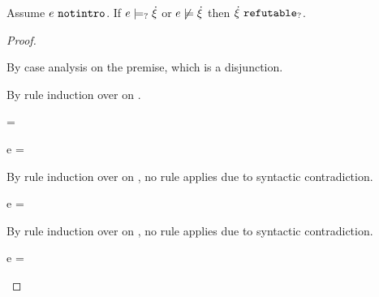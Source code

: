 \begin{lemma}
  \label{lem:notintro-maysat-or-notsat-refutable}
  Assume $e ~\mathtt{notintro}$. If $e \models_{?} \dot{\xi}$ or $e \not\models \dot{\xi}$ then $\dot{\xi} ~\mathtt{refutable}_?$.
\end{lemma}
\begin{proof}
\begin{pfsteps}
  \item {}  
\end{pfsteps}
By case analysis on the premise, which is a disjunction.
\begin{byCases}
  \item[\cmaysatisfy{e}{\hxi}] 
  \begin{pfsteps}
  \item {}  
  \end{pfsteps} 
  By rule induction over  on .
  \begin{byCases}
    \item[\text{(\ref{rule:CMSUnknown})}]
    \begin{pfsteps}
    \item \hxi = \cunknown {}
    \item {} 
    \end{pfsteps} 
    \item[\text{(\ref{rule:CMSInl})}]
    \begin{pfsteps}
    \item e =  
    \end{pfsteps} 
    By rule induction over  on , no rule applies due to syntactic contradiction.
    \item[\text{(\ref{rule:CMSInr})}]
    \begin{pfsteps}
    \item e =  
    \end{pfsteps} 
    By rule induction over  on , no rule applies due to syntactic contradiction.
    \item[\text{(\ref{rule:CMSPair1}), (\ref{rule:CMSPair2}), (\ref{rule:CMSPair3})}]
    \begin{pfsteps}
    \item e =  

\end{pfsteps}
\end{byCases}
\end{byCases}
\end{proof}

